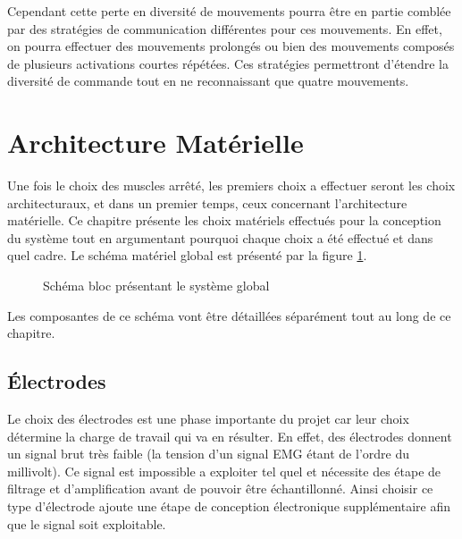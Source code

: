 \documentclass[letterpaper, twoside, 12pt, memoire, creativecommons, hyperref]{thETS}
\begin{document}
Cependant cette perte en diversité de mouvements pourra être en partie comblée par des stratégies de communication différentes pour ces mouvements. En effet, on pourra effectuer des mouvements prolongés ou bien des mouvements composés de plusieurs activations courtes répétées. Ces stratégies permettront d'étendre la diversité de commande tout en ne reconnaissant que quatre mouvements. 


\section{Architecture Matérielle}
\label{CHarchimat}

Une fois le choix des muscles arrêté, les premiers choix a effectuer seront les choix architecturaux, et dans un premier temps, ceux concernant l'architecture matérielle. Ce chapitre présente les choix matériels effectués pour la conception du système tout en argumentant pourquoi chaque choix a été effectué et dans quel cadre. Le schéma matériel global est présenté par la figure \ref{fig:archiMatTot}.

\begin{figure}
	\centering
	\caption{Schéma bloc présentant le système global}
	\label{fig:archiMatTot}
\end{figure}

Les composantes de ce schéma vont être détaillées séparément tout au long de ce chapitre.

\subsection{Électrodes}

Le choix des électrodes est une phase importante du projet car leur choix détermine la charge de travail qui va en résulter. En effet, des électrodes donnent un signal brut très faible (la tension d'un signal EMG étant de l'ordre du millivolt). Ce signal est impossible a exploiter tel quel et nécessite des étape de filtrage et d'amplification avant de pouvoir être échantillonné. Ainsi choisir ce type d'électrode ajoute une étape de conception électronique supplémentaire afin que le signal soit exploitable.
\end{document}
